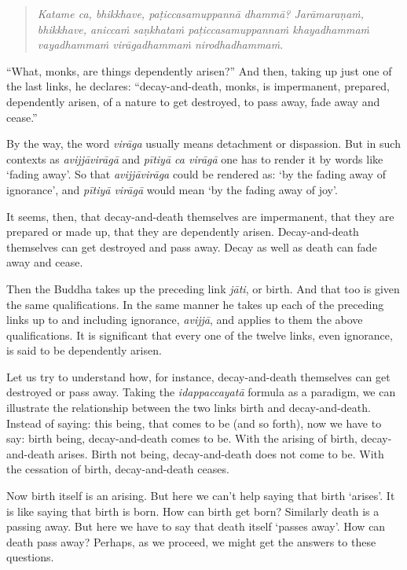 \begin{quote}
\emph{Katame ca, bhikkhave, paṭiccasamuppannā dhammā? Jarāmaraṇaṁ, bhikkhave, aniccaṁ saṇkhataṁ paṭiccasamuppannaṁ khayadhammaṁ vayadhammaṁ virāgadhammaṁ nirodhadhammaṁ}.
\end{quote}

``What, monks, are things dependently arisen?'' And then, taking up just one of the last links, he declares: ``decay-and-death, monks, is impermanent, prepared, dependently arisen, of a nature to get destroyed, to pass away, fade away and cease.''

By the way, the word \emph{virāga} usually means detachment or dispassion. But in such contexts as \emph{avijjāvirāgā} and \emph{pītiyā ca virāgā} one has to render it by words like `fading away'. So that \emph{avijjāvirāga} could be rendered as: `by the fading away of ignorance', and \emph{pītiyā virāgā} would mean `by the fading away of joy'.

It seems, then, that decay-and-death themselves are impermanent, that they are prepared or made up, that they are dependently arisen. Decay-and-death themselves can get destroyed and pass away. Decay as well as death can fade away and cease.

Then the Buddha takes up the preceding link \emph{jāti}, or birth. And that too is given the same qualifications. In the same manner he takes up each of the preceding links up to and including ignorance, \emph{avijjā}, and applies to them the above qualifications. It is significant that every one of the twelve links, even ignorance, is said to be dependently arisen.

Let us try to understand how, for instance, decay-and-death themselves can get destroyed or pass away. Taking the \emph{idappaccayatā} formula as a paradigm, we can illustrate the relationship between the two links birth and decay-and-death. Instead of saying: this being, that comes to be (and so forth), now we have to say: birth being, decay-and-death comes to be. With the arising of birth, decay-and-death arises. Birth not being, decay-and-death does not come to be. With the cessation of birth, decay-and-death ceases.

Now birth itself is an arising. But here we can't help saying that birth `arises'. It is like saying that birth is born. How can birth get born? Similarly death is a passing away. But here we have to say that death itself `passes away'. How can death pass away? Perhaps, as we proceed, we might get the answers to these questions.

